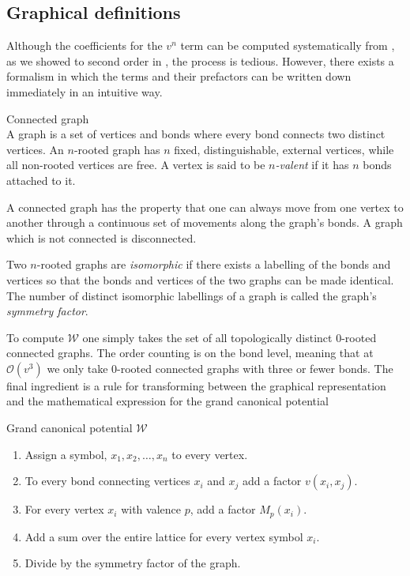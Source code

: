\subsection{Graphical definitions}

Although the coefficients for the $v^n$ term can be computed systematically from
,  as we showed to second order in
, the process is tedious. However, there
exists a formalism in which the terms and their prefactors can be written down
immediately in an intuitive way.
%
\begin{definition}{Connected graph}\label{def:graph}\\
  A graph is a set of vertices and bonds where every bond connects two distinct
  vertices. An $n$-rooted graph has $n$ fixed, distinguishable, external
  vertices, while all non-rooted vertices are free. A vertex is said to be
  \emph{$n$-valent} if it has $n$ bonds attached to it.

  A connected graph has the property that one can always move from one vertex to
  another through a continuous set of movements along the graph's bonds. A graph
  which is not connected is disconnected.

  Two $n$-rooted graphs are \emph{isomorphic} if there exists a labelling of the
  bonds and vertices so that the bonds and vertices of the two graphs can be
  made identical. The number of distinct isomorphic labellings of a graph is
  called the graph's \emph{symmetry factor}.
\end{definition}
%
\noindent{}%
To compute $\mathcal{W}$ one simply takes the set of all topologically distinct
$0$-rooted connected graphs. The order counting is on the bond level, meaning
that at $\mathcal{O}(v^3)$ we only take $0$-rooted connected graphs with three
or fewer bonds. The final ingredient is a rule for transforming between the
graphical representation and the mathematical expression for the grand canonical
potential
%
\begin{ruledef}{Grand canonical potential $\mathcal{W}$} \label{rule:free_energy}
  \begin{enumerate}
    \item Assign a symbol, $x_1, x_2, \dots, x_n$ to every vertex.
    \item To every bond connecting vertices $x_i$ and $x_j$ add a factor
      $v(x_i,x_j)$.
    \item For every vertex $x_i$ with valence $p$, add a factor $M_p(x_i)$.
    \item Add a sum over the entire lattice for every vertex symbol $x_i$.
    \item Divide by the symmetry factor of the graph.
  \end{enumerate}
\end{ruledef}
